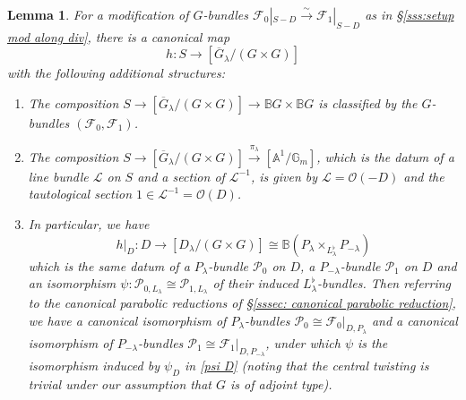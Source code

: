 \documentclass[reqno]{amsart}
\numberwithin{equation}{subsection}
\newtheorem{lemma}[subsubsection]{Lemma}
\theoremstyle{definition}
\def\AA{\mathbb{A}}
\def\BB{\mathbb{B}}
\def\GG{\mathbb{G}}
\newcommand\cF{\mathcal{F}}
\newcommand\cL{\mathcal{L}}
\newcommand\cO{\mathcal{O}}
\newcommand\cP{\mathcal{P}}
\newcommand{\Gm}{\GG_m}
\newcommand{\ov}{\overline}
\newcommand{\isom}{\stackrel{\sim}{\to}}
\newcommand\xr{\xrightarrow}
\renewcommand{\l}{\lambda}
\begin{document}
\begin{lemma}\label{l:map to Vin} For a modification of $G$-bundles $\cF_{0}|_{S-D}\isom \cF_{1}|_{S-D}$ as in \S\ref{sss:setup mod along div}, there is a canonical map 
\begin{equation*}
h: S\to [\ov G_{\l}/(G\times G)]
\end{equation*}
with the following additional structures:
\begin{enumerate}
\item The composition $S\to [\ov G_{\l}/(G\times G)]\to \BB G\times \BB G$ is classified by the $G$-bundles $(\cF_{0},\cF_{1})$.
\item The composition $S\to [\ov G_{\l}/(G\times G)]\xr{\pi_{\l}}[\AA^{1}/\Gm]$, which is the datum of a line bundle $\cL$ on $S$ and a section of $\cL^{-1}$, is given by $\cL=\cO(-D)$ and the tautological section $1\in \cL^{-1}=\cO(D)$.
\item In particular, we have
\begin{equation*}
h|_{D}: D\to [D_{\l}/(G\times G)]\cong \BB(P_{\l}\times_{L^{\flat}_{\l}}P_{-\l})
\end{equation*}
which is the same datum of a $P_{\l}$-bundle $\cP_{0}$ on $D$, a $P_{-\l}$-bundle $\cP_{1}$ on $D$ and an isomorphism $\psi: \cP_{0,L_{\l}}\cong \cP_{1,L_{\l}}$ of their induced $L_{\l}^{\flat}$-bundles. Then referring to the canonical parabolic reductions of \S \ref{sssec: canonical parabolic reduction}, we have a canonical isomorphism of $P_{\l}$-bundles $\cP_{0}\cong \cF_{0}|_{D, P_{\l}}$ and a canonical isomorphism of $P_{-\l}$-bundles $\cP_{1}\cong \cF_{1}|_{D, P_{-\l}}$, under which $\psi$ is the isomorphism induced by $\psi_{D}$ in \eqref{psi D} (noting that the central twisting is trivial under our assumption that $G$ is of adjoint type).
\end{enumerate}
\end{lemma}
\end{document}
